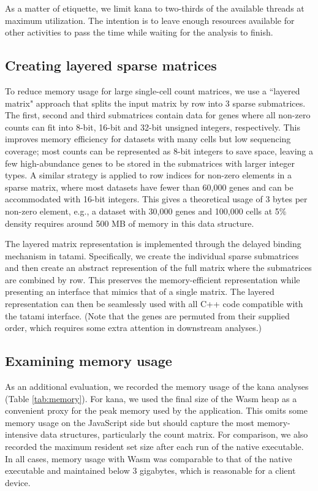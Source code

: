 \documentclass{article}
\begin{document}
As a matter of etiquette, we limit kana to two-thirds of the available threads at maximum utilization.
The intention is to leave enough resources available for other activities to pass the time while waiting for the analysis to finish.

\subsection{Creating layered sparse matrices}

To reduce memory usage for large single-cell count matrices, we use a ``layered matrix" approach that splits the input matrix by row into 3 sparse submatrices.
The first, second and third submatrices contain data for genes where all non-zero counts can fit into 8-bit, 16-bit and 32-bit unsigned integers, respectively.
This improves memory efficiency for datasets with many cells but low sequencing coverage;
most counts can be represented as 8-bit integers to save space, leaving a few high-abundance genes to be stored in the submatrices with larger integer types.
A similar strategy is applied to row indices for non-zero elements in a sparse matrix, where most datasets have fewer than 60,000 genes and can be accommodated with 16-bit integers.
This gives a theoretical usage of 3 bytes per non-zero element, e.g., a dataset with 30,000 genes and 100,000 cells at 5\% density requires around 500 MB of memory in this data structure.

The layered matrix representation is implemented through the delayed binding mechanism in tatami.
Specifically, we create the individual sparse submatrices and then create an abstract represention of the full matrix where the submatrices are combined by row.
This preserves the memory-efficient representation while presenting an interface that mimics that of a single matrix.
The layered representation can then be seamlessly used with all C++ code compatible with the tatami interface.
(Note that the genes are permuted from their supplied order, which requires some extra attention in downstream analyses.)

\subsection{Examining memory usage}

As an additional evaluation, we recorded the memory usage of the kana analyses (Table \ref{tab:memory}).
For kana, we used the final size of the Wasm heap as a convenient proxy for the peak memory used by the application.
This omits some memory usage on the JavaScript side but should capture the most memory-intensive data structures, particularly the count matrix.
For comparison, we also recorded the maximum resident set size after each run of the native executable.
In all cases, memory usage with Wasm was comparable to that of the native executable and maintained below 3 gigabytes,
which is reasonable for a client device.
\end{document}
